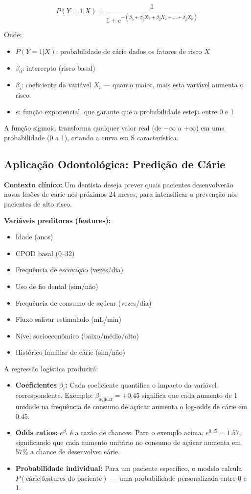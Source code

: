 \begin{equation}
P(Y=1 | X) = \frac{1}{1 + e^{-(\beta_0 + \beta_1 X_1 + \beta_2 X_2 + \ldots + \beta_p X_p)}}
\end{equation}

Onde:
\begin{itemize}
    \item $P(Y=1|X)$: probabilidade de cárie dados os fatores de risco $X$
    \item $\beta_0$: intercepto (risco basal)
    \item $\beta_i$: coeficiente da variável $X_i$ — quanto maior, mais esta variável aumenta o risco
    \item $e$: função exponencial, que garante que a probabilidade esteja entre 0 e 1
\end{itemize}

A função sigmoid transforma qualquer valor real (de $-\infty$ a $+\infty$) em uma probabilidade (0 a 1), criando a curva em S característica.

\subsection{Aplicação Odontológica: Predição de Cárie}

\textbf{Contexto clínico:} Um dentista deseja prever quais pacientes desenvolverão novas lesões de cárie nos próximos 24 meses, para intensificar a prevenção nos pacientes de alto risco.

\textbf{Variáveis preditoras (features):}
\begin{itemize}
    \item Idade (anos)
    \item CPOD basal (0--32)
    \item Frequência de escovação (vezes/dia)
    \item Uso de fio dental (sim/não)
    \item Frequência de consumo de açúcar (vezes/dia)
    \item Fluxo salivar estimulado (mL/min)
    \item Nível socioeconômico (baixo/médio/alto)
    \item Histórico familiar de cárie (sim/não)
\end{itemize}

A regressão logística produzirá:
\begin{itemize}
    \item \textbf{Coeficientes $\beta_i$:} Cada coeficiente quantifica o impacto da variável correspondente. Exemplo: $\beta_{\text{açúcar}} = +0.45$ significa que cada aumento de 1 unidade na frequência de consumo de açúcar aumenta o log-odds de cárie em 0.45.
    \item \textbf{Odds ratios:} $e^{\beta_i}$ é a razão de chances. Para o exemplo acima, $e^{0.45} = 1.57$, significando que cada aumento unitário no consumo de açúcar aumenta em 57\% a chance de desenvolver cárie.
    \item \textbf{Probabilidade individual:} Para um paciente específico, o modelo calcula $P(\text{cárie} | \text{features do paciente})$ — uma probabilidade personalizada entre 0 e 1.
\end{itemize}

